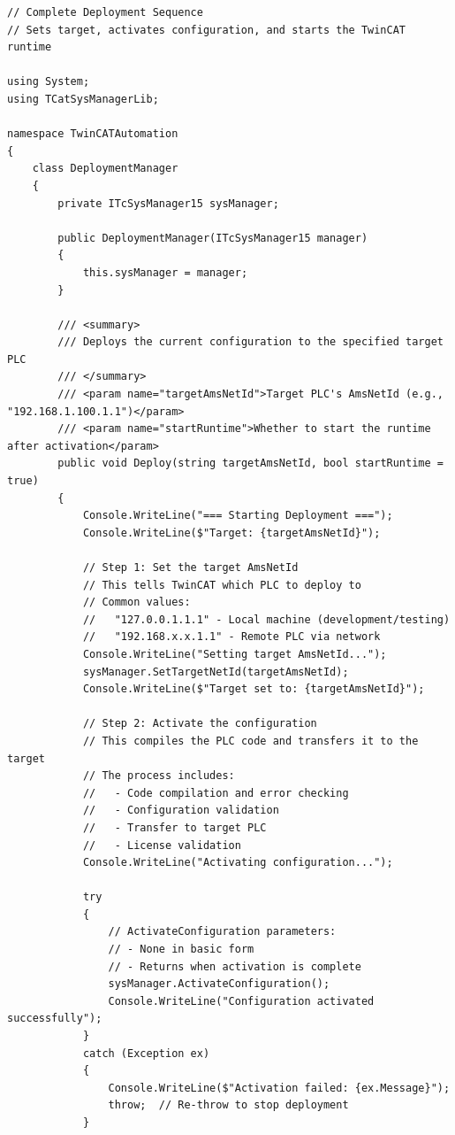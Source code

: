 \documentclass[11pt,a4paper]{article}
\begin{document}
\begin{lstlisting}[style=csharpstyle]
// Complete Deployment Sequence
// Sets target, activates configuration, and starts the TwinCAT runtime

using System;
using TCatSysManagerLib;

namespace TwinCATAutomation
{
    class DeploymentManager
    {
        private ITcSysManager15 sysManager;
        
        public DeploymentManager(ITcSysManager15 manager)
        {
            this.sysManager = manager;
        }
        
        /// <summary>
        /// Deploys the current configuration to the specified target PLC
        /// </summary>
        /// <param name="targetAmsNetId">Target PLC's AmsNetId (e.g., "192.168.1.100.1.1")</param>
        /// <param name="startRuntime">Whether to start the runtime after activation</param>
        public void Deploy(string targetAmsNetId, bool startRuntime = true)
        {
            Console.WriteLine("=== Starting Deployment ===");
            Console.WriteLine($"Target: {targetAmsNetId}");
            
            // Step 1: Set the target AmsNetId
            // This tells TwinCAT which PLC to deploy to
            // Common values:
            //   "127.0.0.1.1.1" - Local machine (development/testing)
            //   "192.168.x.x.1.1" - Remote PLC via network
            Console.WriteLine("Setting target AmsNetId...");
            sysManager.SetTargetNetId(targetAmsNetId);
            Console.WriteLine($"Target set to: {targetAmsNetId}");
            
            // Step 2: Activate the configuration
            // This compiles the PLC code and transfers it to the target
            // The process includes:
            //   - Code compilation and error checking
            //   - Configuration validation
            //   - Transfer to target PLC
            //   - License validation
            Console.WriteLine("Activating configuration...");
            
            try
            {
                // ActivateConfiguration parameters:
                // - None in basic form
                // - Returns when activation is complete
                sysManager.ActivateConfiguration();
                Console.WriteLine("Configuration activated successfully");
            }
            catch (Exception ex)
            {
                Console.WriteLine($"Activation failed: {ex.Message}");
                throw;  // Re-throw to stop deployment
            }
            

\end{lstlisting}
\end{document}
